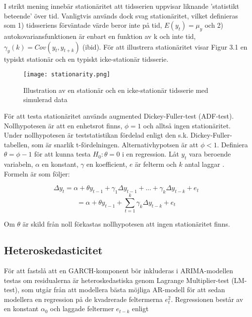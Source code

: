 \documentclass[11pt]{article}
\numberwithin{equation}{section}
\numberwithin{table}{section}
\numberwithin{figure}{section}
\begin{document}
I strikt mening innebär stationäritet att tidsserien uppvisar liknande 'statistikt beteende' över tid. Vanligtvis används dock svag stationäritet, vilket definieras som 1) tidsseriens förväntade värde beror inte på tid, \(E(y_t)=\mu_y\) och 2) autokovariansfunktionen är enbart en funktion av k och inte tid, \(\gamma_y(k) = Cov(y_t, y_{t+k})\) (ibid). För att illustrera stationäritet visar Figur 3.1 en typiskt stationär och en typiskt icke-stationär tidsserie.

\begin{figure}[H]
\caption{Illustration av en stationär och en icke-stationär tidsserie med simulerad data}
\texttt{[image: stationarity.png]}
\centering
\end{figure}

För att testa stationäritet används augmented Dickey-Fuller-test (ADF-test). Nollhypotesen är att en enhetsrot finns, \(\phi=1\) och alltså ingen stationäritet. Under nollhypotesen är teststatistikan fördelad enligt den s.k. Dickey-Fuller-tabellen, som är snarlik t-fördelningen. Alternativhypotsen är att \(\phi<1\). Definiera \(\theta = \phi -1 \) för att kunna testa \(H_0:\theta=0\) i en regression. Låt \(y_t\) vara beroende variabeln, \( \alpha \) en konstant, \( \gamma \) en koefficient, \(e\) är felterm och $k$ antal laggar \parencite[][,s.610 ff.]{wooldridge2018introductory}. Formeln är som följer:

\begin{equation}
    \Delta y_t = \alpha + \theta y_{t-1} + \gamma_1\Delta y_{t-1} + ... + \gamma_k\Delta y_{t-k} + e_t
\end{equation}
\begin{equation}
        = \alpha + \theta y_{t-1} + \sum_{t=1}^{k}\gamma_k \Delta y_{t-k} + e_t
\end{equation}

Om \(\theta\) är skild från noll förkastas nollhypotesen att ingen stationäritet finns.

\subsection{Heteroskedasticitet}

För att fastslå att en GARCH-komponent bör inkluderas i ARIMA-modellen testas om residualerna är heteroskedastiska genom Lagrange Multiplier-test (LM-test), som utgår från att modellera bästa möjliga AR-modell för att sedan modellera en regression på de kvadrerade feltermerna \(e_t^2\). Regressionen består av en konstant \(\alpha_0\) och laggade feltermer \(e_{t-k}\) enligt
\end{document}
